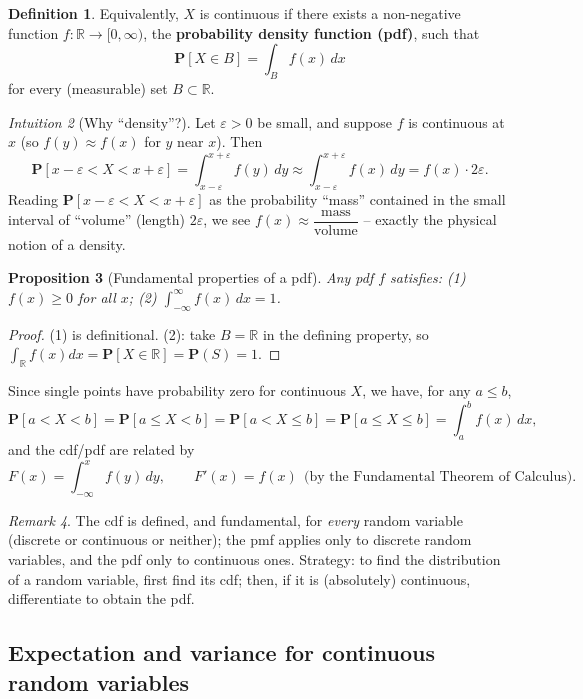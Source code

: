 \documentclass[11pt]{article}
\theoremstyle{definition}
\newtheorem{definition}{Definition}[section]
\theoremstyle{plain}
\newtheorem{proposition}[definition]{Proposition}
\theoremstyle{remark}
\newtheorem{remark}[definition]{Remark}
\newtheorem{intuition}[definition]{Intuition}
\newcommand{\R}{\mathbb{R}}
\begin{document}
\begin{definition}
Equivalently, $X$ is continuous if there exists a non-negative function $f:\R\to[0,\infty)$, the
\textbf{probability density function (pdf)}, such that
\[
\mathbf{P}[X\in B] = \int_B f(x)\,dx
\]
for every (measurable) set $B\subset\R$.
\end{definition}

\begin{intuition}[Why ``density''?]
Let $\varepsilon>0$ be small, and suppose $f$ is continuous at $x$ (so $f(y)\approx f(x)$ for $y$
near $x$). Then
\[
\mathbf{P}[x-\varepsilon<X<x+\varepsilon] = \int_{x-\varepsilon}^{x+\varepsilon} f(y)\,dy
\approx \int_{x-\varepsilon}^{x+\varepsilon} f(x)\,dy = f(x)\cdot 2\varepsilon.
\]
Reading $\mathbf{P}[x-\varepsilon<X<x+\varepsilon]$ as the probability ``mass'' contained in the
small interval of ``volume'' (length) $2\varepsilon$, we see $f(x) \approx
\dfrac{\text{mass}}{\text{volume}}$ -- exactly the physical notion of a density.
\end{intuition}

\begin{proposition}[Fundamental properties of a pdf]
Any pdf $f$ satisfies: (1) $f(x)\ge 0$ for all $x$; (2) $\displaystyle\int_{-\infty}^\infty
f(x)\,dx = 1$.
\end{proposition}
\begin{proof}
(1) is definitional. (2): take $B=\R$ in the defining property, so
$\int_\R f(x)dx = \mathbf{P}[X\in\R]=\mathbf{P}(S)=1$.
\end{proof}

Since single points have probability zero for continuous $X$, we have, for any $a\le b$,
\[
\mathbf{P}[a<X<b]=\mathbf{P}[a\le X<b]=\mathbf{P}[a<X\le b]=\mathbf{P}[a\le X\le b]
= \int_a^b f(x)\,dx,
\]
and the cdf/pdf are related by
\[
F(x) = \int_{-\infty}^x f(y)\,dy, \qquad F'(x)=f(x) \ \ \text{(by the Fundamental Theorem of Calculus)}.
\]

\begin{remark}
The cdf is defined, and fundamental, for \emph{every} random variable (discrete or continuous or
neither); the pmf applies only to discrete random variables, and the pdf only to continuous ones.
Strategy: to find the distribution of a random variable, first find its cdf; then, if it is
(absolutely) continuous, differentiate to obtain the pdf.
\end{remark}

\subsection{Expectation and variance for continuous random variables}
\end{document}
